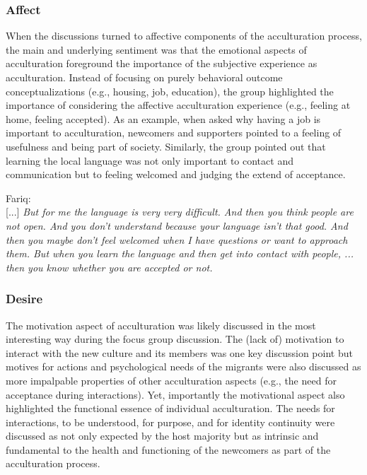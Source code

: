 \documentclass[man, 12pt, a4paper]{apa7}
\begin{document}
\subsubsection{Affect}
When the discussions turned to affective components of the acculturation process, the main and underlying sentiment was that the emotional aspects of acculturation foreground the importance of the subjective experience as acculturation. Instead of focusing on purely behavioral outcome conceptualizations (e.g., housing, job, education), the group highlighted the importance of considering the affective acculturation experience (e.g., feeling at home, feeling accepted). As an example, when asked why having a job is important to acculturation, newcomers and supporters pointed to a feeling of usefulness and being part of society. Similarly, the group pointed out that learning the local language was not only important to contact and communication but to feeling welcomed and judging the extend of acceptance. 
\begin{displayquote}
    Fariq:\\
    {[...]} \textit{But for me the language is very very difficult. And then you think people are not open. And you don't understand because your language isn't that good. And then you maybe don't feel welcomed when I have questions or want to approach them. But when you learn the language and then get into contact with people, ... then you know whether you are accepted or not.}
\end{displayquote}

\subsubsection{Desire}
The motivation aspect of acculturation was likely discussed in the most interesting way during the focus group discussion. The (lack of) motivation to interact with the new culture and its members was one key discussion point but motives for actions and psychological needs of the migrants were also discussed as more impalpable properties of other acculturation aspects (e.g., the need for acceptance during interactions). Yet, importantly the motivational aspect also highlighted the functional essence of individual acculturation. The needs for interactions, to be understood, for purpose, and for identity continuity were discussed as not only expected by the host majority but as intrinsic and fundamental to the health and functioning of the newcomers as part of the acculturation process.
\end{document}
